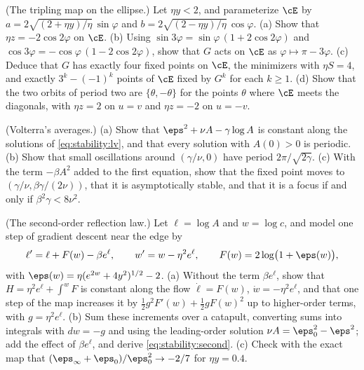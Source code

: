 \begin{refsection}
\begin{exercises}
\item \consolidation (The tripling map on the ellipse.) Let $\eta y<2$, and parameterize $\cE$ by $a=2\sqrt{(2+\eta y)/\eta}\,\sin\varphi$ and $b=2\sqrt{(2-\eta y)/\eta}\,\cos\varphi$. (a) Show that $\eta z=-2\cos2\varphi$ on $\cE$. (b) Using $\sin3\varphi=\sin\varphi\,(1+2\cos2\varphi)$ and $\cos3\varphi=-\cos\varphi\,(1-2\cos2\varphi)$, show that $G$ acts on $\cE$ as $\varphi\mapsto\pi-3\varphi$. (c) Deduce that $G$ has exactly four fixed points on $\cE$, the minimizers with $\eta S=4$, and exactly $3^k-(-1)^k$ points of $\cE$ fixed by $G^k$ for each $k\ge1$. (d) Show that the two orbits of period two are $\{\theta,-\theta\}$ for the points $\theta$ where $\cE$ meets the diagonals, with $\eta z=2$ on $u=v$ and $\eta z=-2$ on $u=-v$.\label{ex:stability:tripling}

\item \consolidation (Volterra's averages.) (a) Show that $\eps^2+\nu A-\gamma\log A$ is constant along the solutions of \eqref{eq:stability:lv}, and that every solution with $A(0)>0$ is periodic. (b) Show that small oscillations around $(\gamma/\nu,0)$ have period $2\pi/\sqrt{2\gamma}$. (c) With the term $-\beta A^2$ added to the first equation, show that the fixed point moves to $(\gamma/\nu,\beta\gamma/(2\nu))$, that it is asymptotically stable, and that it is a focus if and only if $\beta^2\gamma<8\nu^2$.\label{ex:stability:volterra}

\item \consolidation\harder (The second-order reflection law.) Let $\ell=\log A$ and $w=\log c$, and model one step of gradient descent near the edge by
\[
  \ell'=\ell+F(w)-\beta e^{\ell},\qquad w'=w-\eta^2e^{\ell},\qquad F(w)=2\log\bigl(1+\eps(w)\bigr),
\]
with $\eps(w)=\eta(e^{2w}+4y^2)^{1/2}-2$. (a) Without the term $\beta e^\ell$, show that $H=\eta^2e^\ell+\int^wF$ is constant along the flow $\dot\ell=F(w)$, $\dot w=-\eta^2e^\ell$, and that one step of the map increases it by $\frac12g^2F'(w)+\frac12gF(w)^2$ up to higher-order terms, with $g=\eta^2e^\ell$. (b) Sum these increments over a catapult, converting sums into integrals with $dw=-g$ and using the leading-order solution $\nu A=\eps_0^2-\eps^2$; add the effect of $\beta e^\ell$, and derive \eqref{eq:stability:second}. (c) Check with the exact map that $(\eps_\infty+\eps_0)/\eps_0^2\to-2/7$ for $\eta y=0.4$. \label{ex:stability:second}


\end{exercises}
\end{refsection}
